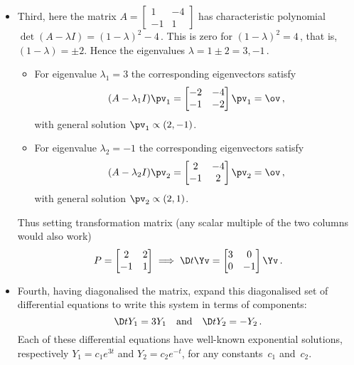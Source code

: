 \begin{itemize}
\item Third, here the matrix \(A=\begin{bmatrix} 1&-4\\-1&1 \end{bmatrix}\) has characteristic polynomial \(\det(A-\lambda I)=(1-\lambda)^2-4\)\,.
This is zero for \((1-\lambda)^2=4\)\,, that is, \((1-\lambda)=\pm2\).
Hence the eigenvalues \(\lambda=1\pm2=3,-1\)\,.
\begin{itemize}
\item For eigenvalue \(\lambda_1=3\) the corresponding eigenvectors satisfy
\begin{equation*}
(A-\lambda_1I)\pv_1=\begin{bmatrix} -2&-4\\-1&-2 \end{bmatrix}\pv_1=\ov\,,
\end{equation*}
with general solution \(\pv_1\propto(2,-1)\).

\item For eigenvalue \(\lambda_2=-1\) the corresponding eigenvectors satisfy
\begin{equation*}
(A-\lambda_2I)\pv_2=\begin{bmatrix} 2&-4\\-1&2 \end{bmatrix}\pv_2=\ov\,,
\end{equation*}
with general solution \(\pv_2\propto(2,1)\).
\end{itemize}
Thus setting transformation matrix (any scalar multiple of the two columns would also work)
\begin{equation*}
P=\begin{bmatrix} 2&2\\-1&1 \end{bmatrix}
\implies \D t\Yv=\begin{bmatrix} 3&0\\0&-1 \end{bmatrix}\Yv\,.
\end{equation*}

\item Fourth, having diagonalised the matrix, expand this diagonalised set of differential equations to write this system in terms of components: 
\begin{equation*}
\D t{Y_1}=3Y_1 \quad\text{and}\quad \D t{Y_2}=-Y_2\,.
\end{equation*}
Each of these differential equations have well-known exponential solutions, respectively \(Y_1=c_1e^{3t}\) and \(Y_2=c_2e^{-t}\),  for any constants~\(c_1\) and~\(c_2\).


\end{itemize}
